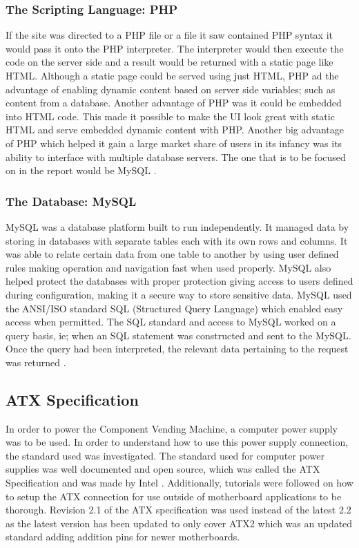 \documentclass[a4paper,11pt]{article}
\numberwithin{figure}{section}
\numberwithin{table}{section}
\begin{document}
\subsubsection{The Scripting Language: PHP}
If the site was directed to a PHP file or a file it saw contained PHP syntax it would pass it onto the PHP interpreter. The interpreter would then execute the code on the server side and a result would be returned with a static page like HTML. Although a static page could be served using just HTML, PHP ad the advantage of enabling dynamic content based on server side variables; such as content from a database. Another advantage of PHP was it could be embedded into HTML code. This made it possible to make the UI look great with static HTML and serve embedded dynamic content with PHP. Another big advantage of PHP which helped it gain a large market share of users in its infancy was its ability to interface with multiple database servers. The one that is to be focused on in the report would be MySQL \cite{PHP}.


\subsubsection{The Database: MySQL}
MySQL was a database platform built to run independently. It managed data by storing in databases with separate tables each with its own rows and columns. It was able to relate certain data from one table to another by using user defined rules making operation and navigation fast when used properly. MySQL also helped protect the databases with proper protection giving access to users defined during configuration, making it a secure way to store sensitive data. MySQL used the ANSI/ISO standard SQL (Structured Query Language) which enabled easy access when permitted. The SQL standard and access to MySQL worked on a query basis, ie; when an SQL statement was constructed and sent to the MySQL. Once the query had been interpreted, the relevant data pertaining to the request was returned \cite{mysql}.  

\subsection{ATX Specification}
In order to power the Component Vending Machine, a computer power supply was to be used. In order to understand how to use this power supply connection, the standard used was investigated. The standard used for computer power supplies was well documented and open source, which was called the ATX Specification and was made by Intel \cite{ATX}. Additionally, tutorials were followed on how to setup the ATX connection for use outside of motherboard applications to be thorough. Revision 2.1 of the ATX specification was used instead of the latest 2.2 as the latest version has been updated to only cover ATX2 which was an updated standard adding addition pins for newer motherboards.
\end{document}
